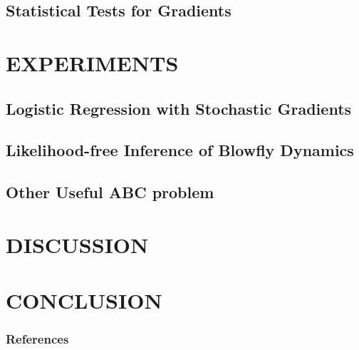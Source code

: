 \documentclass[]{article}
\begin{document}
\subsection{Statistical Tests for Gradients}

\section{EXPERIMENTS} \label{experiments}

\subsection{Logistic Regression with Stochastic Gradients}

\subsection{Likelihood-free Inference of Blowfly Dynamics}

\subsection{Other Useful ABC problem}

\section{DISCUSSION} \label{discussion}

\section{CONCLUSION} \label{conclusion}

\subsubsection*{References}
\newpage
{

}
\end{document}
